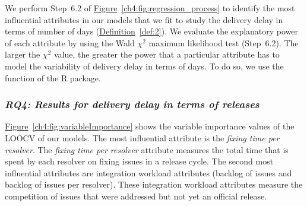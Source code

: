 We perform Step~6.2 of
\hyperref[ch4:fig:regression_process]{Figure}~\ref{ch4:fig:regression_process} to
identify the most influential attributes in our models that we fit to study the
delivery delay in terms of number of days
(\hyperref[def:2]{Definition}~\ref{def:2}). We evaluate the explanatory power of
each attribute by using the Wald $\chi^2$ maximum likelihood test (Step~6.2).
The larger the $\chi^2$ value, the greater the power that a particular attribute
has to model the variability of delivery delay in terms of days. To do so, we
use the  function of the  R package.

\subsubsection*{\textit{\textbf{RQ4: Results for delivery delay in terms of
releases}}}

\noindent\DIFdelbegin \textit{\textbf{}%
}
\DIFdelend \DIFaddbegin {}
\DIFaddend \hyperref[ch4:fig:variableImportance]{Figure}~\ref{ch4:fig:variableImportance} shows the
variable importance values of the LOOCV of our models. The most influential
attribute is the \textit{fixing time per resolver}. The \textit{fixing time per
resolver} attribute measures the total time that is spent by each resolver on
fixing issues in a release cycle. The second most influential attributes are
integration workload attributes (\ie backlog of issues and backlog of issues per
resolver). These integration workload attributes measure the competition of
issues that were addressed but not yet \DIFdelbegin {}\DIFdelend \DIFaddbegin {}\DIFaddend an official release.

